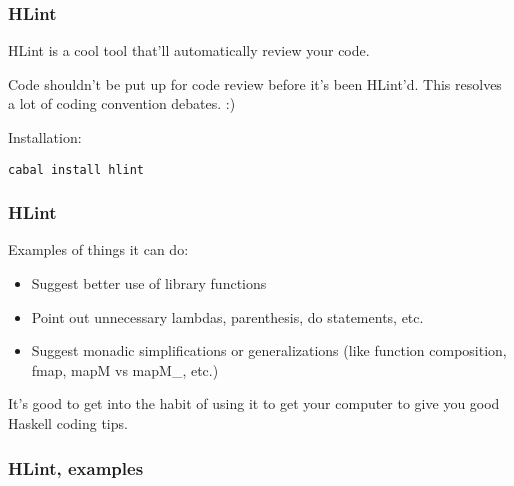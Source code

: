 \documentclass{beamer}
\begin{document}
\begin{frame}[fragile]
\frametitle{HLint}

HLint is a cool tool that'll automatically review your code.

\bigskip
Code shouldn't be put up for code review before it's been HLint'd.
This resolves a lot of coding convention debates. :)

\bigskip
Installation:
\begin{verbatim}
cabal install hlint
\end{verbatim}

\end{frame}


\begin{frame}[fragile]
\frametitle{HLint}

Examples of things it can do:

\begin{itemize}
  \item Suggest better use of library functions
  \item Point out unnecessary lambdas, parenthesis, do statements, etc.
  \item Suggest monadic simplifications or generalizations (like
    function composition, fmap, mapM vs mapM\_, etc.)
\end{itemize}
\bigskip

It's good to get into the habit of using it to get your computer to
give you good Haskell coding tips.

\end{frame}


\begin{frame}[fragile]
\frametitle{HLint, examples}



\end{frame}
\end{document}
